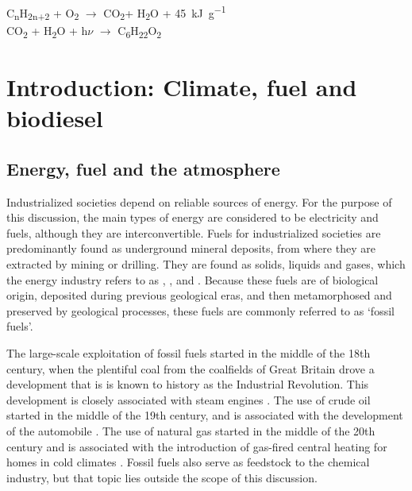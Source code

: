 \begin{savequote}[\quotewidth]
C\textsubscript{n}H\textsubscript{2n+2} + O\textsubscript{2} $\rightarrow$ CO\textsubscript{2}+ H\textsubscript{2}O + \SI{45}{\kilo\joule\per\gram}\\
CO\textsubscript{2} + H\textsubscript{2}O + h$\nu$ $\rightarrow$ C\textsubscript{6}H\textsubscript{22}O\textsubscript{2} 
\end{savequote}

\chapter{Introduction: Climate, fuel and biodiesel} %

\label{Chapter1} %


\section{Energy, fuel and the atmosphere}

Industrialized societies depend on reliable sources of energy. For the purpose
of this discussion, the main types of energy are considered to be electricity and
fuels, although they are interconvertible. Fuels for industrialized societies
are predominantly found as underground mineral deposits, from where they are
extracted by mining or drilling. They are found as solids, liquids and gases,
which the energy industry refers to as , , and
. Because these fuels are of biological origin, deposited
during previous geological eras, and then metamorphosed and preserved by
geological processes, these fuels are commonly referred to as `fossil fuels'.

The large-scale exploitation of fossil fuels started in the middle of the 18th
century, when the plentiful coal from the coalfields of Great Britain drove a
development that is is known to history as the Industrial Revolution. This
development is closely associated with steam engines \autocite{Rosen2012}. The
use of crude oil started in the middle of the 19th century, and is associated
with the development of the automobile \autocite[p. 42]{Watts2005}. The use of
natural gas started in the middle of the 20th century and is associated with the
introduction of gas-fired central heating for homes in cold climates
\autocite{Hanmer2017}. Fossil fuels also serve as feedstock to the chemical
industry, but that topic lies outside the scope of this discussion.

